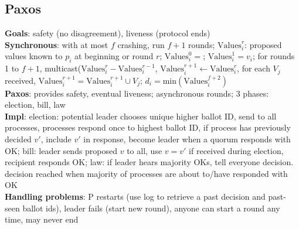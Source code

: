 \documentclass{article}
\begin{document}
\begin{multicols*}{3}
\section{Paxos}
\textbf{Goals}: safety (no disagreement), liveness (protocol ends) \\
\textbf{Synchronous}: with at most $f$ crashing, run $f+1$ rounds; $\text{Values}^r_i$: proposed values known to $p_i$ at beginning or round $r$; $\text{Values}^0_i = {}$; $\text{Values}^1_i = {v_i}$; for rounds 1 to $f+1$, multicast($\text{Values}^r_i - \text{Values}^{r-1}_i$, $\text{Values}^{r+1}_i \leftarrow \text{Values}^r_i$, for each $V_j$ received, $\text{Values}^{r+1}_i = \text{Values}^{r+1}_i \cup V_j$; $d_i = \text{min}(\text{Values}^{f+2}_i)$ \\
\textbf{Paxos}: provides safety, eventual liveness; asynchronous rounds; 3 phases: election, bill, law \\
\textbf{Impl}: election: potential leader chooses unique higher ballot ID, send to all processes, processes respond once to highest ballot ID, if process has previously decided $v\prime$, include $v\prime$ in response, become leader when a quorum responds with OK; bill: leader sends proposed $v$ to all, use $v=v\prime$ if received during election, recipient responds OK; law: if leader hears majority OKs, tell everyone decision. decision reached when majority of processes are about to/have responded with OK \\
\textbf{Handling problems}: P restarts (use log to retrieve a past decision and past- seen ballot ids), leader fails (start new round), anyone can start a round any time, may never end


\end{multicols*}
\end{document}
